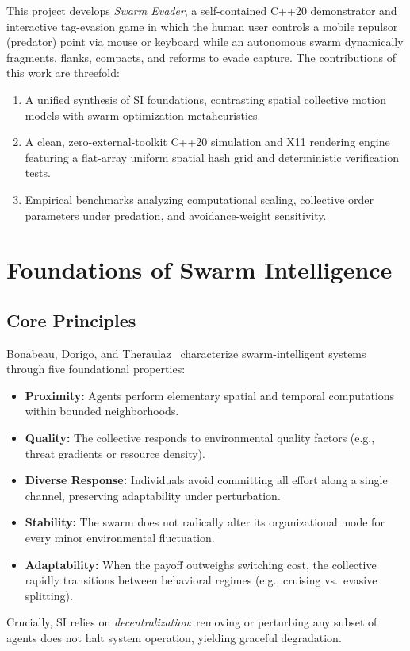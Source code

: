 \documentclass[10pt,twocolumn]{article}
\begin{document}
This project develops \emph{Swarm Evader}, a self-contained C++20 demonstrator and interactive tag-evasion game in which the human user controls a mobile repulsor (predator) point via mouse or keyboard while an autonomous swarm dynamically fragments, flanks, compacts, and reforms to evade capture. The contributions of this work are threefold:
\begin{enumerate}
    \item A unified synthesis of SI foundations, contrasting spatial collective motion models with swarm optimization metaheuristics.
    \item A clean, zero-external-toolkit C++20 simulation and X11 rendering engine featuring a flat-array uniform spatial hash grid and deterministic verification tests.
    \item Empirical benchmarks analyzing computational scaling, collective order parameters under predation, and avoidance-weight sensitivity.
\end{enumerate}

\section{Foundations of Swarm Intelligence}

\subsection{Core Principles}
Bonabeau, Dorigo, and Theraulaz~\cite{bonabeau1999swarm} characterize swarm-intelligent systems through five foundational properties:
\begin{itemize}
    \item \textbf{Proximity:} Agents perform elementary spatial and temporal computations within bounded neighborhoods.
    \item \textbf{Quality:} The collective responds to environmental quality factors (e.g., threat gradients or resource density).
    \item \textbf{Diverse Response:} Individuals avoid committing all effort along a single channel, preserving adaptability under perturbation.
    \item \textbf{Stability:} The swarm does not radically alter its organizational mode for every minor environmental fluctuation.
    \item \textbf{Adaptability:} When the payoff outweighs switching cost, the collective rapidly transitions between behavioral regimes (e.g., cruising vs.\ evasive splitting).
\end{itemize}
Crucially, SI relies on \emph{decentralization}: removing or perturbing any subset of agents does not halt system operation, yielding graceful degradation.
\end{document}
